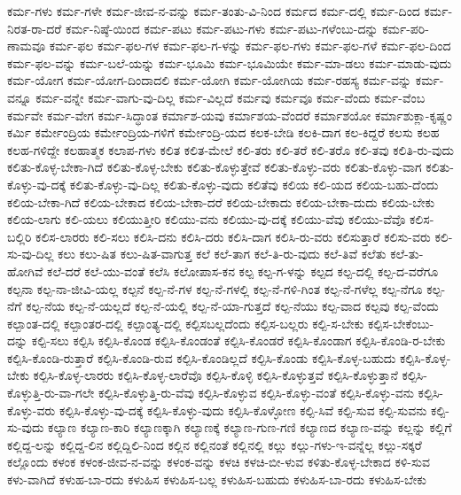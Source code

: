{ಕರ್ಮ-ಗಳು
ಕರ್ಮ-ಗಳೇ
ಕರ್ಮ-ಜೀವ-ನ-ವನ್ನು
ಕರ್ಮ-ತಂತು-ವಿ-ನಿಂದ
ಕರ್ಮದ
ಕರ್ಮ-ದಲ್ಲಿ
ಕರ್ಮ-ದಿಂದ
ಕರ್ಮ-ನಿರತ-ರಾ-ದರೆ
ಕರ್ಮ-ನಿಷ್ಠೆ-ಯಿಂದ
ಕರ್ಮ-ಪಟು
ಕರ್ಮ-ಪಟು-ಗಳು
ಕರ್ಮ-ಪಟು-ಗಳೆಂಬು-ದನ್ನು
ಕರ್ಮ-ಪರಿ-ಣಾಮವೂ
ಕರ್ಮ-ಫಲ
ಕರ್ಮ-ಫಲ-ಗಳ
ಕರ್ಮ-ಫಲ-ಗ-ಳನ್ನು
ಕರ್ಮ-ಫಲ-ಗಳು
ಕರ್ಮ-ಫಲ-ಗಳೆ
ಕರ್ಮ-ಫಲ-ದಿಂದ
ಕರ್ಮ-ಫಲ-ವನ್ನು
ಕರ್ಮ-ಬಲೆ-ಯನ್ನು
ಕರ್ಮ-ಭೂಮಿ
ಕರ್ಮ-ಭೂಮಿಯೇ
ಕರ್ಮ-ಮಾ-ಡಲು
ಕರ್ಮ-ಮಾಡು-ವುದು
ಕರ್ಮ-ಯೋಗ
ಕರ್ಮ-ಯೋಗ-ದಿಂದಾದಲಿ
ಕರ್ಮ-ಯೋಗಿ
ಕರ್ಮ-ಯೋಗಿಯ
ಕರ್ಮ-ರಹಸ್ಯ
ಕರ್ಮ-ವನ್ನು
ಕರ್ಮ-ವನ್ನೂ
ಕರ್ಮ-ವನ್ನೇ
ಕರ್ಮ-ವಾಗು-ವು-ದಿಲ್ಲ
ಕರ್ಮ-ವಿಲ್ಲದೆ
ಕರ್ಮವು
ಕರ್ಮವೂ
ಕರ್ಮ-ವೆಂದು
ಕರ್ಮ-ವೆಂಬ
ಕರ್ಮವೇ
ಕರ್ಮ-ವೇಗ
ಕರ್ಮ-ಸಿದ್ಧಾಂತ
ಕರ್ಮಾಶ-ಯವು
ಕರ್ಮಾಶಯ-ವೆಂದರೆ
ಕರ್ಮಾಶಯೋ
ಕರ್ಮಾಶುಕ್ಲಾ-ಕೃಷ್ಣಂ
ಕರ್ಮಿ
ಕರ್ಮೇಂದ್ರಿಯ
ಕರ್ಮೇಂದ್ರಿಯ-ಗಳಿಗೆ
ಕರ್ಮೇಂದ್ರಿ-ಯದ
ಕಲಕ-ಬೇಡಿ
ಕಲಕಿ-ದಾಗ
ಕಲ-ಕಿದ್ದರೆ
ಕಲಸು
ಕಲಹ
ಕಲಹ-ಗಳಿದ್ದೇ
ಕಲಹಾತ್ಮಕ
ಕಲಾಪ-ಗಳು
ಕಲಿತ
ಕಲಿತ-ಮೇಲೆ
ಕಲಿ-ತರು
ಕಲಿ-ತರೆ
ಕಲಿ-ತರೊ
ಕಲಿ-ತವು
ಕಲಿತಿ-ರು-ವುದು
ಕಲಿತು-ಕೊಳ್ಳ-ಬೇಕಾ-ಗಿದೆ
ಕಲಿತು-ಕೊಳ್ಳ-ಬೇಕು
ಕಲಿತು-ಕೊಳ್ಳುತ್ತೇವೆ
ಕಲಿತು-ಕೊಳ್ಳು-ವರು
ಕಲಿತು-ಕೊಳ್ಳು-ವಾಗ
ಕಲಿತು-ಕೊಳ್ಳು-ವು-ದಕ್ಕೆ
ಕಲಿತು-ಕೊಳ್ಳು-ವು-ದಿಲ್ಲ
ಕಲಿತು-ಕೊಳ್ಳು-ವುದು
ಕಲಿತೆವು
ಕಲಿಯ
ಕಲಿ-ಯದ
ಕಲಿಯ-ಬಹು-ದೆಂದು
ಕಲಿಯ-ಬೇಕಾ-ಗಿದೆ
ಕಲಿಯ-ಬೇಕಾದ
ಕಲಿಯ-ಬೇಕಾ-ದರೆ
ಕಲಿಯ-ಬೇಕಾದು
ಕಲಿಯ-ಬೇಕಾ-ದುದು
ಕಲಿಯ-ಬೇಕು
ಕಲಿಯ-ಲಾಗು
ಕಲಿ-ಯಲು
ಕಲಿಯುತ್ತೀರಿ
ಕಲಿಯು-ವನು
ಕಲಿಯು-ವು-ದಕ್ಕೆ
ಕಲಿಯು-ವೆವು
ಕಲಿಯು-ವೆವೊ
ಕಲಿಸ-ಬಲ್ಲಿರಿ
ಕಲಿಸ-ಲಾರರು
ಕಲಿ-ಸಲು
ಕಲಿಸಿ-ದನು
ಕಲಿಸಿ-ದರು
ಕಲಿಸಿ-ದಾಗ
ಕಲಿಸಿ-ರು-ವರು
ಕಲಿಸುತ್ತಾರೆ
ಕಲಿಸು-ವರು
ಕಲಿ-ಸು-ವು-ದಿಲ್ಲ
ಕಲು
ಕಲು-ಷಿತ
ಕಲು-ಷಿತ-ವಾಗುತ್ತ
ಕಲೆ
ಕಲೆ-ತಾಗ
ಕಲೆ-ತಿ-ರು-ವುದು
ಕಲೆ-ತಿವೆ
ಕಲೆತು
ಕಲೆ-ತು-ಹೋಗಿವೆ
ಕಲೆ-ದರೆ
ಕಲೆ-ಯು-ವಂತೆ
ಕಲೆಸಿ
ಕಲೋಪಾಸ-ಕನ
ಕಲ್ಪ
ಕಲ್ಪ-ಗ-ಳನ್ನು
ಕಲ್ಪದ
ಕಲ್ಪ-ದಲ್ಲಿ
ಕಲ್ಪ-ದ-ವರೆಗೂ
ಕಲ್ಪನಾ
ಕಲ್ಪ-ನಾ-ಜೀವಿ-ಯಲ್ಲ
ಕಲ್ಪನೆ
ಕಲ್ಪ-ನೆ-ಗಳ
ಕಲ್ಪ-ನೆ-ಗಳಲ್ಲಿ
ಕಲ್ಪ-ನೆ-ಗಳಿ-ಗಿಂತ
ಕಲ್ಪ-ನೆ-ಗಳೆಲ್ಲ
ಕಲ್ಪ-ನೆಗೂ
ಕಲ್ಪ-ನೆಗೆ
ಕಲ್ಪ-ನೆಯ
ಕಲ್ಪ-ನೆ-ಯಲ್ಲದೆ
ಕಲ್ಪ-ನೆ-ಯಲ್ಲಿ
ಕಲ್ಪ-ನೆ-ಯಾ-ಗುತ್ತದೆ
ಕಲ್ಪ-ನೆಯು
ಕಲ್ಪ-ವಾದ
ಕಲ್ಪವು
ಕಲ್ಪ-ವೆಂದು
ಕಲ್ಪಾಂತ-ದಲ್ಲಿ
ಕಲ್ಪಾಂತರ-ದಲ್ಲಿ
ಕಲ್ಪಾಂತ್ಯ-ದಲ್ಲಿ
ಕಲ್ಪಿಸಬಲ್ಲದೆಂದು
ಕಲ್ಪಿಸ-ಬಲ್ಲರು
ಕಲ್ಪಿ-ಸ-ಬೇಕು
ಕಲ್ಪಿಸ-ಬೇಕೆಂಬು-ದನ್ನು
ಕಲ್ಪಿ-ಸಲು
ಕಲ್ಪಿಸಿ
ಕಲ್ಪಿಸಿ-ಕೊಂಡ
ಕಲ್ಪಿಸಿ-ಕೊಂಡಂತೆ
ಕಲ್ಪಿಸಿ-ಕೊಂಡರೆ
ಕಲ್ಪಿಸಿ-ಕೊಂಡಾಗ
ಕಲ್ಪಿಸಿ-ಕೊಂಡಿ-ರ-ಬೇಕು
ಕಲ್ಪಿಸಿ-ಕೊಂಡಿ-ರುತ್ತಾರೆ
ಕಲ್ಪಿಸಿ-ಕೊಂಡಿ-ರುವ
ಕಲ್ಪಿಸಿ-ಕೊಂಡಿಲ್ಲದೆ
ಕಲ್ಪಿಸಿ-ಕೊಂಡು
ಕಲ್ಪಿಸಿ-ಕೊಳ್ಳ-ಬಹುದು
ಕಲ್ಪಿಸಿ-ಕೊಳ್ಳ-ಬೇಕು
ಕಲ್ಪಿಸಿ-ಕೊಳ್ಳ-ಲಾರರು
ಕಲ್ಪಿಸಿ-ಕೊಳ್ಳ-ಲಾರೆವೊ
ಕಲ್ಪಿಸಿ-ಕೊಳ್ಳಿ
ಕಲ್ಪಿಸಿ-ಕೊಳ್ಳುತ್ತವೆ
ಕಲ್ಪಿಸಿ-ಕೊಳ್ಳುತ್ತಾನೆ
ಕಲ್ಪಿಸಿ-ಕೊಳ್ಳುತ್ತಿ-ರು-ವಾ-ಗಲೇ
ಕಲ್ಪಿಸಿ-ಕೊಳ್ಳುತ್ತಿ-ರು-ವೆವು
ಕಲ್ಪಿಸಿ-ಕೊಳ್ಳುವ
ಕಲ್ಪಿಸಿ-ಕೊಳ್ಳು-ವಂತೆ
ಕಲ್ಪಿಸಿ-ಕೊಳ್ಳು-ವನು
ಕಲ್ಪಿಸಿ-ಕೊಳ್ಳು-ವರು
ಕಲ್ಪಿಸಿ-ಕೊಳ್ಳು-ವು-ದಕ್ಕೆ
ಕಲ್ಪಿಸಿ-ಕೊಳ್ಳು-ವುದು
ಕಲ್ಪಿಸಿ-ಕೊಳ್ಳೋಣ
ಕಲ್ಪಿ-ಸಿವೆ
ಕಲ್ಪಿ-ಸುವ
ಕಲ್ಪಿ-ಸುವನು
ಕಲ್ಪಿ-ಸು-ವುದು
ಕಲ್ಯಾಣ
ಕಲ್ಯಾಣ-ಕಾರಿ
ಕಲ್ಯಾಣಕ್ಕಾಗಿ
ಕಲ್ಯಾಣಕ್ಕೆ
ಕಲ್ಯಾಣ-ಗುಣ-ಗಣಿ
ಕಲ್ಯಾಣದ
ಕಲ್ಯಾಣ-ವನ್ನು
ಕಲ್ಲನ್ನು
ಕಲ್ಲಿಗೆ
ಕಲ್ಲಿದ್ದ-ಲನ್ನು
ಕಲ್ಲಿದ್ದ-ಲಿನ
ಕಲ್ಲಿದ್ದಿಲಿ-ನಿಂದ
ಕಲ್ಲಿನ
ಕಲ್ಲಿನಂತೆ
ಕಲ್ಲಿನಲ್ಲಿ
ಕಲ್ಲು
ಕಲ್ಲು-ಗಳು-ಇ-ವನ್ನೆಲ್ಲ
ಕಲ್ಲು-ಸಕ್ಕರೆ
ಕಲ್ಲೊಂದು
ಕಳಂಕ
ಕಳಂಕ-ಜೀವ-ನ-ವನ್ನು
ಕಳಂಕ-ವನ್ನು
ಕಳಚಿ
ಕಳಚಿ-ಬೀ-ಳುವ
ಕಳಿತು-ಕೊಳ್ಳ-ಬೇಕಾದ
ಕಳಿ-ಸುವ
ಕಳು-ವಾಗಿದೆ
ಕಳುಹ-ಬಾ-ರದು
ಕಳುಹಿಸ
ಕಳುಹಿಸ-ಬಲ್ಲ
ಕಳುಹಿಸ-ಬಹುದು
ಕಳುಹಿಸ-ಬಾ-ರದು
ಕಳುಹಿಸ-ಬೇಕು
}
